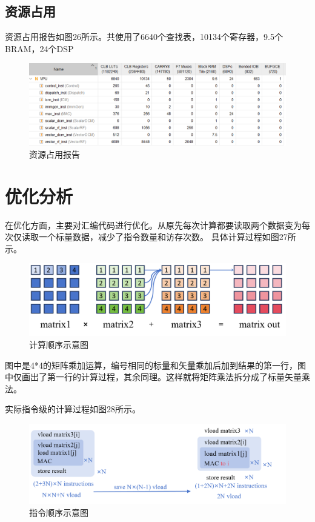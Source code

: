 \documentclass[UTF8]{ctexart}
\begin{document}
\subsection{资源占用}

资源占用报告如图26所示。共使用了6640个查找表，10134个寄存器，9.5个BRAM，24个DSP

\begin{figure}[htbp]
    \centering
    \includegraphics[width=16cm]{pic/utilization.png}
    \caption{资源占用报告}
\end{figure}

\section{优化分析}

在优化方面，主要对汇编代码进行优化。从原先每次计算都要读取两个数据变为每次仅读取一个标量数据，减少了指令数量和访存次数。
具体计算过程如图27所示。

\begin{figure}[htbp]
    \centering
    \includegraphics[width=14cm]{pic/calcu_ill.png}
    \caption{计算顺序示意图}
\end{figure}

图中是4*4的矩阵乘加运算，编号相同的标量和矢量乘加后加到结果的第一行，图中仅画出了第一行的计算过程，其余同理。这样就将矩阵乘法拆分成了标量矢量乘法。

实际指令级的计算过程如图28所示。

\begin{figure}[htbp]
    \centering
    \includegraphics[width=14cm]{pic/compile_pattern.png}
    \caption{指令顺序示意图}
\end{figure}
\end{document}
